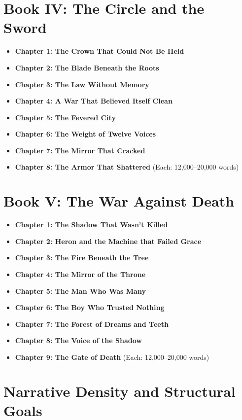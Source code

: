 \documentclass[9pt]{article}
\begin{document}
\section*{Book IV: The Circle and the Sword}
\begin{itemize}
  \item \textbf{Chapter 1: The Crown That Could Not Be Held}
  \item \textbf{Chapter 2: The Blade Beneath the Roots}
  \item \textbf{Chapter 3: The Law Without Memory}
  \item \textbf{Chapter 4: A War That Believed Itself Clean}
  \item \textbf{Chapter 5: The Fevered City}
  \item \textbf{Chapter 6: The Weight of Twelve Voices}
  \item \textbf{Chapter 7: The Mirror That Cracked}
  \item \textbf{Chapter 8: The Armor That Shattered}
  \hfill (Each: 12,000–20,000 words)
\end{itemize}

\section*{Book V: The War Against Death}
\begin{itemize}
  \item \textbf{Chapter 1: The Shadow That Wasn’t Killed}
  \item \textbf{Chapter 2: Heron and the Machine that Failed Grace}
  \item \textbf{Chapter 3: The Fire Beneath the Tree}
  \item \textbf{Chapter 4: The Mirror of the Throne}
  \item \textbf{Chapter 5: The Man Who Was Many}
  \item \textbf{Chapter 6: The Boy Who Trusted Nothing}
  \item \textbf{Chapter 7: The Forest of Dreams and Teeth}
  \item \textbf{Chapter 8: The Voice of the Shadow}
  \item \textbf{Chapter 9: The Gate of Death}
  \hfill (Each: 12,000–20,000 words)
\end{itemize}

\section*{Narrative Density and Structural Goals}
\end{document}
